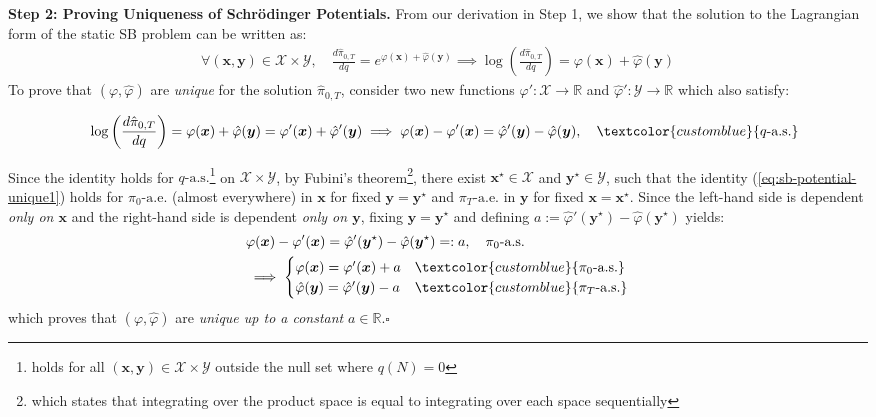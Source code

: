 \documentclass{article}
\newcommand{\bluetext}[1]{\textcolor{customblue}{#1}}
\begin{document}
\textbf{Step 2: Proving Uniqueness of Schrödinger Potentials.} 
From our derivation in Step 1, we show that the solution to the Lagrangian form of the static SB problem can be written as:
\begin{align}
    \forall (\boldsymbol{x}, \boldsymbol{y}) \in \mathcal{X}\times\mathcal{Y}, \quad\frac{d\hat{\pi}_{0,T}}{dq}=e^{\varphi(\boldsymbol{x})+\hat{\varphi}(\boldsymbol{y})}\implies \log \left(\frac{d\hat{\pi}_{0,T}}{dq}\right)=\varphi(\boldsymbol{x})+\hat{\varphi}(\boldsymbol{y})
\end{align}
To prove that $(\varphi, \hat{\varphi})$ are \textit{unique} for the solution $\hat{\pi}_{0,T}$, consider two new functions $\varphi':\mathcal{X}\to \mathbb{R}$ and $\hat{\varphi}':\mathcal{Y}\to \mathbb{R}$ which also satisfy:
\begin{small}
\begin{align}
     \quad\log \left(\frac{d\hat{\pi}_{0,T}}{dq}\right)=\varphi(\boldsymbol{x})+\hat{\varphi}(\boldsymbol{y})=\varphi'(\boldsymbol{x})+\hat{\varphi}'(\boldsymbol{y})\implies \varphi(\boldsymbol{x})-\varphi'(\boldsymbol{x})=\hat{\varphi}'(\boldsymbol{y})-\hat{\varphi}(\boldsymbol{y}), \quad \bluetext{q\text{-a.s.}}\label{eq:sb-potential-unique1}
\end{align}
\end{small}
Since the identity holds for $q\text{-a.s.}$\footnote{holds for all $(\boldsymbol{x},\boldsymbol{y})\in \mathcal{X}\times \mathcal{Y}$ outside the null set where $q(N)=0$} on $\mathcal{X}\times \mathcal{Y}$, by Fubini's theorem\footnote{which states that integrating over the product space is equal to integrating over each space sequentially}, there exist $\boldsymbol{x}^\star\in \mathcal{X}$ and $\boldsymbol{y}^\star\in \mathcal{Y}$, such that the identity (\ref{eq:sb-potential-unique1}) holds for $\pi_0\text{-a.e.}$ (almost everywhere) in $\boldsymbol{x}$ for fixed $\boldsymbol{y}=\boldsymbol{y}^\star$ and $\pi_T\text{-a.e.}$ in $\boldsymbol{y}$ for fixed $\boldsymbol{x}=\boldsymbol{x}^\star$. Since the left-hand side is dependent \textit{only on $\boldsymbol{x}$} and the right-hand side is dependent \textit{only on $\boldsymbol{y}$}, fixing $\boldsymbol{y}=\boldsymbol{y}^\star$ and defining $a:=\hat{\varphi}'(\boldsymbol{y}^\star)-\hat{\varphi}(\boldsymbol{y}^\star)$ yields:
\begin{align}
    &\varphi(\boldsymbol{x})-\varphi'(\boldsymbol{x}) =\hat{\varphi}'(\boldsymbol{y}^\star)-\hat{\varphi}(\boldsymbol{y}^\star)=:a, \quad \pi_0\text{-a.s.}\\
    &\implies \begin{cases}
        \varphi(\boldsymbol{x})=\varphi'(\boldsymbol{x})+a & \bluetext{\pi_0\text{-a.s.}}\\
        \hat{\varphi}(\boldsymbol{y})=\hat{\varphi}'(\boldsymbol{y})-a & \bluetext{\pi_T\text{-a.s.}}
    \end{cases}
\end{align}
which proves that $(\varphi, \hat{\varphi})$ are \textit{unique up to a constant} $a\in \mathbb{R}$.\hfill $\square$
\end{document}
